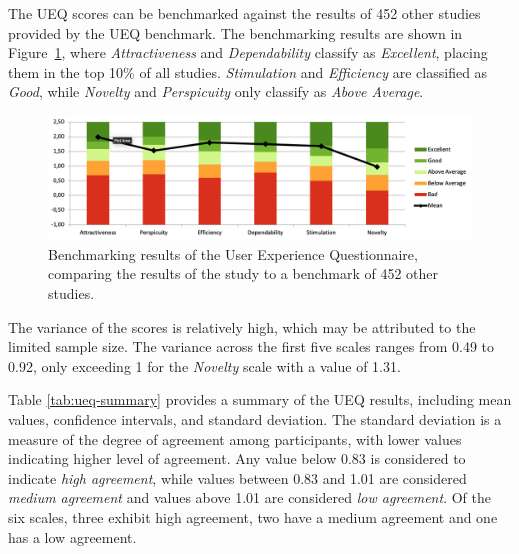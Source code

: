 The UEQ scores can be benchmarked against the results of 452 other studies provided by the UEQ benchmark.
The benchmarking results are shown in Figure~\ref{fig:ueq-2}, where \emph{Attractiveness} and \emph{Dependability} classify as \emph{Excellent}, placing them in the top 10\% of all studies.
\emph{Stimulation} and \emph{Efficiency} are classified as \emph{Good}, while \emph{Novelty} and \emph{Perspicuity} only classify as \emph{Above Average}.

\begin{figure}[htb]
	\includegraphics[width=\textwidth]{figures/ueq-2.png}
  \caption{Benchmarking results of the User Experience Questionnaire, comparing the results of the study to a benchmark of 452 other studies.}
  \label{fig:ueq-2}
\end{figure}

The variance of the scores is relatively high, which may be attributed to the limited sample size.
The variance across the first five scales ranges from 0.49 to 0.92, only exceeding 1 for the \emph{Novelty} scale with a value of 1.31.

Table \ref{tab:ueq-summary} provides a summary of the UEQ results, including mean values, confidence intervals, and standard deviation.
The standard deviation is a measure of the degree of agreement among participants, with lower values indicating higher level of agreement.
Any value below 0.83 is considered to indicate \emph{high agreement}, while values between 0.83 and 1.01 are considered \emph{medium agreement} and values above 1.01 are considered \emph{low agreement}.
Of the six scales, three exhibit high agreement, two have a medium agreement and one has a low agreement.

